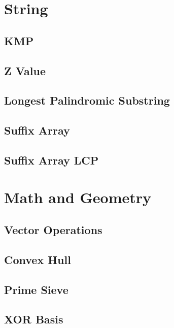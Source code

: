 \documentclass[twocolumn]{article}
\begin{document}
\section{String}

\subsection{KMP}


\subsection{Z Value}


\subsection{Longest Palindromic Substring}


\subsection{Suffix Array}


\subsection{Suffix Array LCP}


\section{Math and Geometry}

\subsection{Vector Operations}


\subsection{Convex Hull}


\subsection{Prime Sieve}


\subsection{XOR Basis}

\end{document}
